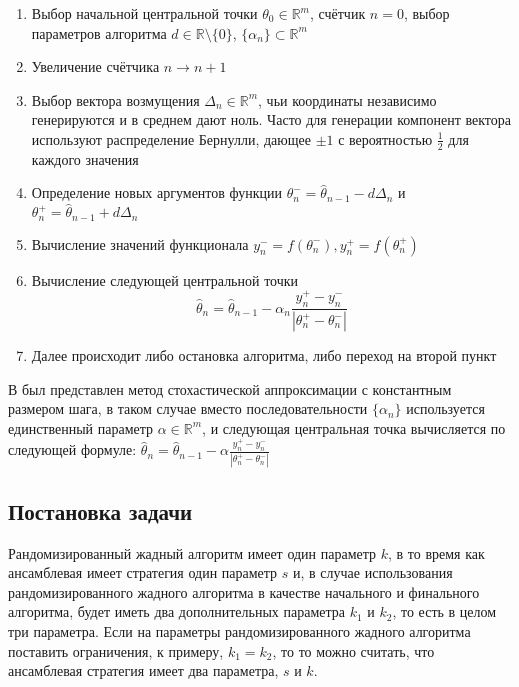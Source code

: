 \begin{enumerate}
	\item Выбор начальной центральной точки $\theta_0 \in \mathbb{R}^m$, счётчик $n = 0$, выбор параметров алгоритма $d \in \mathbb{R} \setminus \{0\}$, $\{\alpha_n\} \subset \mathbb{R}^m$
	\item Увеличение счётчика $n \rightarrow n + 1$
	\item Выбор вектора возмущения $\Delta_n \in \mathbb{R}^m$, чьи координаты независимо генерируются и в среднем дают ноль. Часто для генерации компонент вектора используют распределение Бернулли, дающее $\pm1$ с вероятностью $\frac{1}{2}$ для каждого значения
	\item Определение новых аргументов функции $\theta_{n}^{-}=\hat{\theta}_{n - 1} - d\Delta_{n}$ и $\theta_{n}^{+}=\hat{\theta}_{n - 1} + d\Delta_{n}$
	\item Вычисление значений функционала $y_n^{-} = f(\theta_{n}^{-}), y_n^{+} = f(\theta_{n}^{+})$
	\item Вычисление следующей центральной точки
	\begin{equation} \label{eq:spsa-central}
		\hat{\theta}_n = \hat{\theta}_{n - 1} - \alpha_n \frac{y_n^{+} - y_n^{-}}{|\theta_{n}^{+} - \theta_{n}^{-}|}
	\end{equation}
	\item Далее происходит либо остановка алгоритма, либо переход на второй пункт
\end{enumerate}

В \cite{Granichin&Amelina:2015} был представлен метод стохастической аппроксимации с константным размером шага, в таком случае вместо последовательности $\{\alpha_n\}$ используется единственный параметр $\alpha \in \mathbb{R}^m$, и следующая центральная точка вычисляется по следующей формуле: $\hat{\theta}_n = \hat{\theta}_{n - 1} - \alpha \frac{y_n^{+} - y_n^{-}}{|\theta_{n}^{+} - \theta_{n}^{-}|}$



\subsection{Постановка задачи}

Рандомизированный жадный алгоритм имеет один параметр $k$, в то время как ансамблевая имеет стратегия один параметр $s$ и, в случае использования рандомизированного жадного алгоритма в качестве начального и финального алгоритма, будет иметь два дополнительных параметра $k_1$ и $k_2$, то есть в целом три параметра. Если на параметры рандомизированного жадного алгоритма поставить ограничения, к примеру, $k_1 = k_2$, то то можно считать, что ансамблевая стратегия имеет два параметра, $s$ и $k$.

